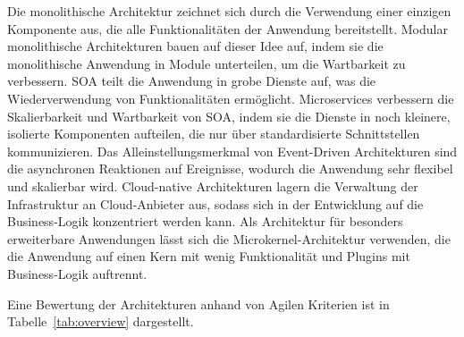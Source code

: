 \documentclass[acmtog]{acmart}
\begin{document}
Die monolithische Architektur zeichnet sich durch die Verwendung einer einzigen Komponente aus, die alle Funktionalitäten der Anwendung bereitstellt.
Modular monolithische Architekturen bauen auf dieser Idee auf, indem sie die monolithische Anwendung in Module unterteilen, um die Wartbarkeit zu verbessern.
SOA teilt die Anwendung in grobe Dienste auf, was die Wiederverwendung von Funktionalitäten ermöglicht.
Microservices verbessern die Skalierbarkeit und Wartbarkeit von SOA, indem sie die Dienste in noch kleinere, isolierte Komponenten aufteilen, die nur über standardisierte Schnittstellen kommunizieren.
Das Alleinstellungsmerkmal von Event-Driven Architekturen sind die asynchronen Reaktionen auf Ereignisse, wodurch die Anwendung sehr flexibel und skalierbar wird.
Cloud-native Architekturen lagern die Verwaltung der Infrastruktur an Cloud-Anbieter aus, sodass sich in der Entwicklung auf die Business-Logik konzentriert werden kann.
Als Architektur für besonders erweiterbare Anwendungen lässt sich die Microkernel-Architektur verwenden, die die Anwendung auf einen Kern mit wenig Funktionalität und Plugins mit Business-Logik auftrennt.

Eine Bewertung der Architekturen anhand von Agilen Kriterien ist in Tabelle~\ref{tab:overview} dargestellt.
\end{document}

